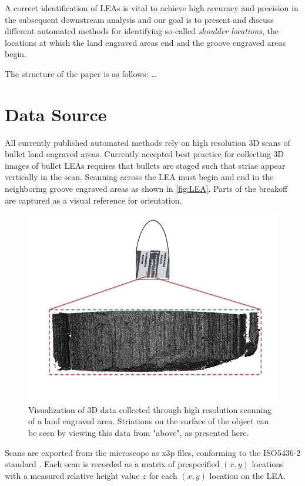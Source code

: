 \documentclass[12pt]{article}
\begin{document}
A correct identification of LEAs is vital to achieve high accuracy and
precision in the subsequent downstream analysis and our goal is to
present and discuss different automated methods for identifying
so-called \emph{shoulder locations}, the locations at which the land
engraved areas end and the groove engraved areas begin.

The structure of the paper is as follows: \ldots{}

\section{Data Source}

All currently published automated methods rely on high resolution 3D
scans of bullet land engraved areas. Currently accepted best practice
for collecting 3D images of bullet LEAs requires that bullets are staged
such that striae appear vertically in the scan. Scanning across the LEA
must begin and end in the neighboring groove engraved areas as shown in
\autoref{fig:LEA}. Parts of the breakoff  are captured as
a visual reference for orientation.

\begin{figure}
\includegraphics[width=\textwidth]{./images/3d_plot_top_context_breakoff} \caption{\label{LEA}Visualization of 3D data collected through high resolution scanning of a land engraved area. Striations on the surface of the object can be seen by viewing this data from "above", as presented here.}\label{fig:LEA}
\end{figure}

Scans are exported from the microscope as x3p files, conforming to the
ISO5436-2 standard \citep{ISO5436}. Each scan is recorded as a matrix of
prespecified \((x,y)\) locations with a measured relative height value
\(z\) for each \((x,y)\) location on the LEA.
\end{document}
